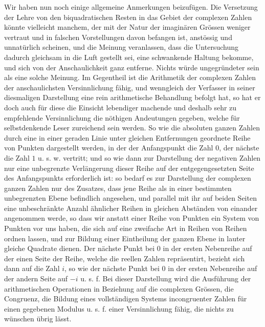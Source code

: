 \documentclass[12pt]{article}
\begin{document}
Wir haben nun noch einige allgemeine Anmerkungen beizufügen. Die Versetzung der Lehre von den biquadratischen Resten in das Gebiet der complexen Zahlen könnte vielleicht manchem, der mit der Natur der imaginären Grössen weniger vertraut und in falschen Vorstellungen davon befangen ist, anstössig und unnatürlich scheinen, und die Meinung veranlassen, dass die Untersuchung dadurch gleichsam in die Luft gestellt sei, eine schwankende Haltung bekomme, und sich von der Anschaulichkeit ganz entferne. Nichts würde ungegründeter sein als eine solche Meinung. Im Gegentheil ist die Arithmetik der complexen Zahlen der anschaulichsten Versinnlichung fähig, und wenngleich der Verfasser in seiner diesmaligen Darstellung eine rein arithmetische Behandlung befolgt hat, so hat er doch auch für diese die Einsicht lebendiger machende und deshalb sehr zu empfehlende Versinnlichung die nöthigen Andeutungen gegeben, welche für selbstdenkende Leser zureichend sein werden. So wie die absoluten ganzen Zahlen durch eine in einer geraden Linie unter gleichen Entfernungen geordnete Reihe von Punkten dargestellt werden, in der der Anfangspunkt die Zahl $0$, der nächste die Zahl $1$ u. s. w. vertritt; und so wie dann zur Darstellung der negativen Zahlen nur eine unbegrenzte Verlängerung dieser Reihe auf der entgegengesetzten Seite des Anfangspunkts erforderlich ist: so bedarf es zur Darstellung der complexen ganzen Zahlen nur des Zusatzes, dass jene Reihe als in einer bestimmten unbegrenzten Ebene befindlich angesehen, und parallel mit ihr auf beiden Seiten eine unbeschränkte Anzahl ähnlicher Reihen in gleichen Abständen von einander angenommen werde, so dass wir anstatt einer Reihe von Punkten ein System von Punkten vor uns haben, die sich auf eine zweifache Art in Reihen von Reihen ordnen lassen, und zur Bildung einer Eintheilung der ganzen Ebene in lauter gleiche Quadrate dienen. Der nächste Punkt bei $0$ in der ersten Nebenreihe auf der einen Seite der Reihe, welche die reellen Zahlen repräsentirt, bezieht sich dann auf die Zahl $i$, so wie der nächste Punkt bei $0$ in der ersten Nebenreihe auf der andern Seite auf $-i$ u. s. f. Bei dieser Darstellung wird die Ausführung der arithmetischen Operationen in Beziehung auf die complexen Grössen, die Congruenz, die Bildung eines vollständigen Systems incongruenter Zahlen für einen gegebenen Modulus u. s. f. einer Versinnlichung fähig, die nichts zu wünschen übrig lässt.
\end{document}
